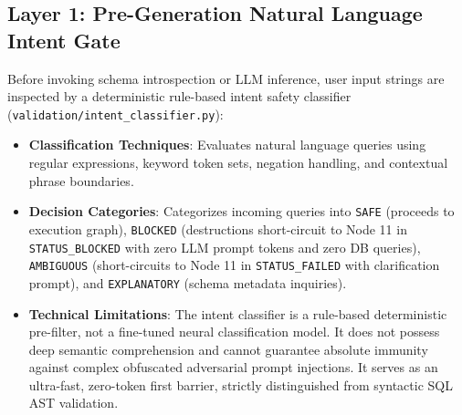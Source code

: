 \documentclass[conference]{IEEEtran}
\begin{document}
\subsection{Layer 1: Pre-Generation Natural Language Intent Gate}
Before invoking schema introspection or LLM inference, user input strings are inspected by a deterministic rule-based intent safety classifier (\texttt{validation/intent\_classifier.py}):
\begin{itemize}
    \item \textbf{Classification Techniques}: Evaluates natural language queries using regular expressions, keyword token sets, negation handling, and contextual phrase boundaries.
    \item \textbf{Decision Categories}: Categorizes incoming queries into \texttt{SAFE} (proceeds to execution graph), \texttt{BLOCKED} (destructions short-circuit to Node 11 in \texttt{STATUS\_BLOCKED} with zero LLM prompt tokens and zero DB queries), \texttt{AMBIGUOUS} (short-circuits to Node 11 in \texttt{STATUS\_FAILED} with clarification prompt), and \texttt{EXPLANATORY} (schema metadata inquiries).
    \item \textbf{Technical Limitations}: The intent classifier is a rule-based deterministic pre-filter, not a fine-tuned neural classification model. It does not possess deep semantic comprehension and cannot guarantee absolute immunity against complex obfuscated adversarial prompt injections. It serves as an ultra-fast, zero-token first barrier, strictly distinguished from syntactic SQL AST validation.
\end{itemize}
\end{document}

